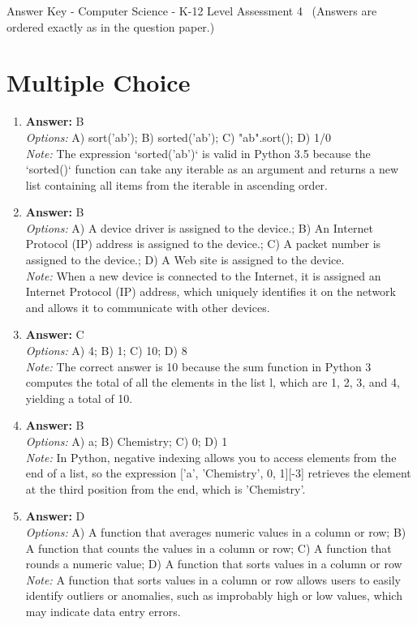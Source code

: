 \documentclass[12pt]{article}
\begin{document}
\begin{center}
Answer Key - Computer Science - K-12 Level Assessment 4 \
\small (Answers are ordered exactly as in the question paper.)
\end{center}

\section*{Multiple Choice}
\begin{enumerate}[label=\arabic*.]
\item \textbf{Answer:} B
\\ \textit{Options:} A) sort('ab'); B) sorted('ab'); C) "ab".sort(); D) 1/0
\\ \textit{Note:} The expression `sorted('ab')` is valid in Python 3.5 because the `sorted()` function can take any iterable as an argument and returns a new list containing all items from the iterable in ascending order.
\item \textbf{Answer:} B
\\ \textit{Options:} A) A device driver is assigned to the device.; B) An Internet Protocol (IP) address is assigned to the device.; C) A packet number is assigned to the device.; D) A Web site is assigned to the device.
\\ \textit{Note:} When a new device is connected to the Internet, it is assigned an Internet Protocol (IP) address, which uniquely identifies it on the network and allows it to communicate with other devices.
\item \textbf{Answer:} C
\\ \textit{Options:} A) 4; B) 1; C) 10; D) 8
\\ \textit{Note:} The correct answer is 10 because the sum function in Python 3 computes the total of all the elements in the list l, which are 1, 2, 3, and 4, yielding a total of 10.
\item \textbf{Answer:} B
\\ \textit{Options:} A) a; B) Chemistry; C) 0; D) 1
\\ \textit{Note:} In Python, negative indexing allows you to access elements from the end of a list, so the expression ['a', 'Chemistry', 0, 1][-3] retrieves the element at the third position from the end, which is 'Chemistry'.
\item \textbf{Answer:} D
\\ \textit{Options:} A) A function that averages numeric values in a column or row; B) A function that counts the values in a column or row; C) A function that rounds a numeric value; D) A function that sorts values in a column or row
\\ \textit{Note:} A function that sorts values in a column or row allows users to easily identify outliers or anomalies, such as improbably high or low values, which may indicate data entry errors.
\end{enumerate}
\end{document}
